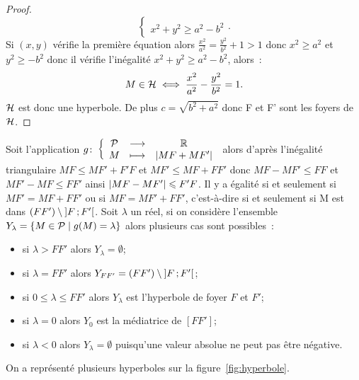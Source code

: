\begin{proof}
\begin{equation}
\begin{cases}
    \\ x^2 + y^2 \geqslant a^2-b^2\end{cases}.
  \end{equation}
  Si \((x, y)\) vérifie la première équation alors \(\frac{x^2}{a^2}= 
  \frac{y^2}{b^2} + 1>1\) donc \(x^2\geqslant a^2\) et \(y^2\geqslant -b^2\) 
  donc il vérifie l'inégalité \(x^2 + y^2\geqslant a^2-b^2\), alors~:
  \begin{equation}
    M \in \mathcal{H} \iff \frac{x^2}{a^2} - \frac{y^2}{b^2} =1.
  \end{equation}
  \(\mathcal{H}\) est donc une hyperbole. De plus \(c = \sqrt{b^2 + a^2}\) donc F et F' 
  sont les foyers de \(\mathcal{H}\).
\end{proof}
Soit l'application \(g\colon \left\{\begin{array}{ccc} \mathcal{P} & \longrightarrow &\mathbb{R}\\ M & \longmapsto & \left\lvert MF + MF'\right\rvert \end{array} \right.\) alors d'après 
l'inégalité triangulaire \(MF \leqslant MF' + F'F\) et \(MF'\leqslant MF + FF'\) 
donc \(MF-MF'\leqslant FF\) et \(MF'-MF\leqslant FF'\) ainsi 
\(\left\lvert MF-MF'\right\rvert\leqslant F'F\). Il y a égalité si et seulement si 
\(MF' = MF + FF'\) ou si \(MF = MF' + FF'\), c'est-à-dire si et seulement si M est 
dans \((FF') \setminus \left] F \, ;  F' \right[\). Soit \(\lambda\) un réel, si on 
considère l'ensemble \(Y_{\lambda} = \left\{M \in \mathcal{P}\mathrel{}\middle|\mathrel{}g(M) = \lambda\right\}\) alors 
plusieurs cas sont possibles~:
\begin{itemize}
  \item si \(\lambda>FF'\) alors \(Y_{\lambda} = \emptyset\);
  \item si \(\lambda = FF'\) alors \(Y_{FF'} = (FF') \setminus 
    \left] F \, ;  F' \right[\);
  \item si \(0\leqslant\lambda\leqslant FF'\) alors \(Y_{\lambda}\) est 
    l'hyperbole de foyer \(F\) et \(F'\);
  \item si \(\lambda = 0\) alors \(Y_{0}\) est la médiatrice de \([FF']\);
  \item si \(\lambda<0\) alors \(Y_{\lambda} = \emptyset\) puisqu'une valeur 
    absolue ne peut pas être négative.
\end{itemize}

On a représenté plusieurs hyperboles sur la figure~\ref{fig:hyperbole}.

